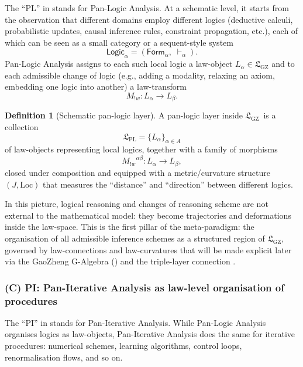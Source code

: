 \documentclass[11pt]{book}
\theoremstyle{plain}
\theoremstyle{definition}
\newtheorem{definition}[theorem]{Definition} \theoremstyle{remark}
\newcommand{\PLPIMMT}{\text{PL-PI MMT}}
\newcommand{\GZLS}{\ensuremath{\mathfrak{L}_{\mathrm{GZ}}}}       \newcommand{\GZLT}{\ensuremath{M_{!w}}}                           \newcommand{\GZLOC}{\ensuremath{A_M}}                             \newcommand{\GZLCurv}{\ensuremath{\mathcal{F}_{\mathrm{law}}}}
\begin{document}
The “PL” in \PLPIMMT stands for Pan-Logic Analysis. At a schematic
level, it starts from the observation that different domains employ
different logics (deductive calculi, probabilistic updates, causal
inference rules, constraint propagation, etc.), each of which can be
seen as a small category or a sequent-style system
\[
   \mathsf{Logic}_\alpha=(\mathsf{Form}_\alpha,\;\vdash_\alpha).
\]
Pan-Logic Analysis assigns to each such local logic a law-object
$L_\alpha\in\GZLS$ and to each admissible change of logic (e.g.,
adding a modality, relaxing an axiom, embedding one logic into
another) a law-transform
\[
   \GZLT\colon L_\alpha \longrightarrow L_\beta.
\]



\begin{definition}[Schematic pan-logic layer]
  A pan-logic layer inside \GZLS\ is a collection
  \[
     \mathfrak{L}_{\mathrm{PL}}
     = \{L_\alpha\}_{\alpha\in A}
  \]
  of law-objects representing local logics, together with a family of
  morphisms
  \[
     \GZLT^{\alpha\beta}\colon L_\alpha \longrightarrow L_\beta,
  \]
  closed under composition and equipped with a metric/curvature
  structure $(J,\mathrm{Loc})$ that measures the “distance” and
  “direction” between different logics.
\end{definition}



In this picture, logical reasoning and changes of reasoning scheme are
not external to the mathematical model: they become trajectories and
deformations inside the law-space. This is the first pillar of the
meta-paradigm: the organisation of all admissible inference schemes as
a structured region of \GZLS, governed by law-connections and
law-curvatures that will be made explicit later via the GaoZheng
G-Algebra (\GAlgebra) and the triple-layer connection \GZTLC.



\subsubsection*{(C) PI: Pan-Iterative Analysis as law-level organisation of procedures}

The “PI” in \PLPIMMT stands for Pan-Iterative Analysis. While Pan-Logic
Analysis organises logics as law-objects, Pan-Iterative Analysis does
the same for iterative procedures: numerical schemes, learning
algorithms, control loops, renormalisation flows, and so on.
\end{document}
